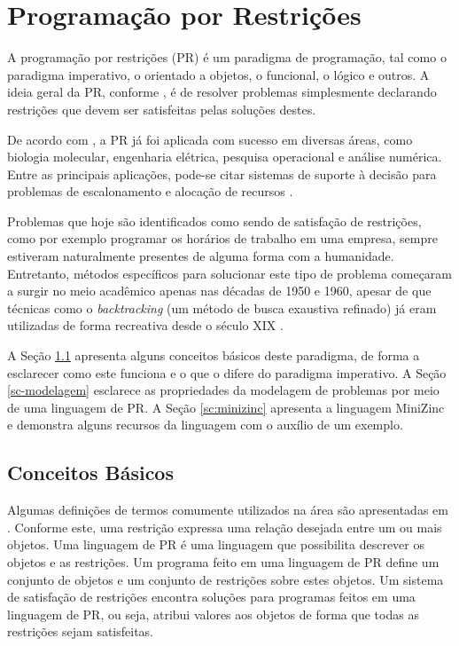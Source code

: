 \chapter{Programação por Restrições}
\label{cp:pr}


A programação por restrições (PR) é um paradigma de programação, tal como o paradigma imperativo, o orientado a objetos, o funcional, o lógico e outros. A ideia geral da PR, conforme \cite{thom}, é de resolver problemas simplesmente declarando restrições que devem ser satisfeitas pelas soluções destes.

De acordo com \cite{apt}, a PR já foi aplicada com sucesso em diversas áreas, como biologia molecular, engenharia elétrica, pesquisa operacional e análise numérica. Entre as principais aplicações, pode-se citar sistemas de suporte à decisão para problemas de escalonamento e alocação de recursos \cite{thom}.

Problemas que hoje são identificados como sendo de satisfação de restrições, como por exemplo programar os horários de trabalho em uma empresa, sempre estiveram naturalmente presentes de alguma forma com a humanidade. Entretanto, métodos específicos para solucionar este tipo de problema começaram a surgir no meio acadêmico apenas nas décadas de 1950 e 1960, apesar de que técnicas como o \textit{backtracking} (um método de busca exaustiva refinado) já eram utilizadas de forma recreativa desde o século XIX \cite{cphandbook}.

A Seção \ref{sc-conceitos-basicos-pr} apresenta alguns conceitos básicos deste paradigma, de forma a esclarecer como este funciona e o que o difere do paradigma imperativo. A Seção \ref{sc-modelagem} esclarece as propriedades da modelagem de problemas por meio de uma linguagem de PR. A Seção \ref{sc:minizinc} apresenta a linguagem MiniZinc e demonstra alguns recursos da linguagem com o auxílio de um exemplo.



\section{Conceitos Básicos}
\label{sc-conceitos-basicos-pr}

Algumas definições de termos comumente utilizados na área são apresentadas em \cite{leler}. Conforme este, uma restrição expressa uma relação desejada entre um ou mais objetos. Uma linguagem de PR é uma linguagem que possibilita descrever os objetos e as restrições. Um programa feito em uma linguagem de PR define um conjunto de objetos e um conjunto de restrições sobre estes objetos. Um sistema de satisfação de restrições encontra soluções para programas feitos em uma linguagem de PR, ou seja, atribui valores aos objetos de forma que todas as restrições sejam satisfeitas.

